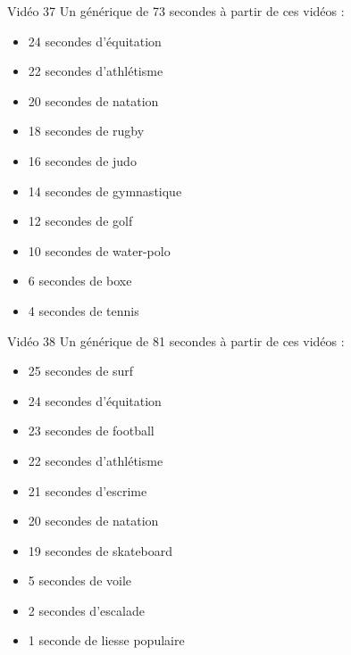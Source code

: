 \documentclass[10pt, a5paper,twoside]{article}
\begin{document}
\begin{card}[width = \textwidth, colback = olympicviolet, colframe = olympicviolet, bottomtitle = 2mm]{Vidéo 37}
  Un générique de 73 secondes à partir de ces vidéos :
  \vspace{-1mm}\begin{itemize}
    \item 24 secondes d'équitation
    \item 22 secondes d'athlétisme
    \item 20 secondes de natation
    \item 18 secondes de rugby
    \item 16 secondes de judo
    \item 14 secondes de gymnastique
    \item 12 secondes de golf
    \item 10 secondes de water-polo
    \item 6 secondes de boxe
    \item 4 secondes de tennis
  \end{itemize}
\end{card}

\vfill

\begin{card}[width = \textwidth, colback = olympicviolet, colframe = olympicviolet, bottomtitle = 2mm]{Vidéo 38}
  Un générique de 81 secondes à partir de ces vidéos :
  \vspace{-1mm}\begin{itemize}
    \item 25 secondes de surf
    \item 24 secondes d'équitation
    \item 23 secondes de football
    \item 22 secondes d'athlétisme
    \item 21 secondes d'escrime
    \item 20 secondes de natation
    \item 19 secondes de skateboard
    \item 5 secondes de voile
    \item 2 secondes d'escalade
    \item 1 seconde de liesse populaire
  \end{itemize}
\end{card}

\vfill

\clearpage
~
\vfill
\end{document}
